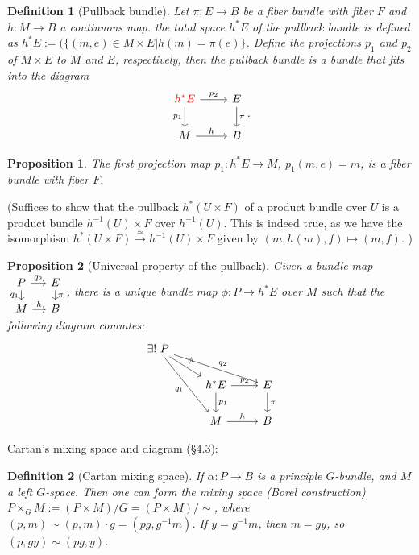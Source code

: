 \documentclass{article}
\theoremstyle{mystyle}
\newtheorem*{definition}{Definition}%
\newtheorem*{proposition*}{Proposition}
\theoremstyle{remark}
\numberwithin{equation}{section}
\begin{document}
\begin{definition}[Pullback bundle] Let $\pi\colon E\rightarrow B$ be a fiber bundle with fiber $F$ and $h\colon M\rightarrow B$ a continuous map. the total space $h^*E$ of the \emph{pullback bundle} is defined as $h^*E:=(\{(m,e)\in M\times E|h(m) = \pi(e)\}$. Define the projections $p_1$ and $p_2$ of $M\times E$ to $M$ and $E$, respectively, then the pullback bundle is a bundle that fits into the diagram
$$
\begin{tikzcd}\color{red}{h^*E}\ar[r,"p_2"]\ar[d,"p_1"'] & E\ar[d,"\pi"]\\M \ar[r,"h"] & B\end{tikzcd}.
$$
\end{definition}

\begin{proposition*} The first projection map $p_1\colon h^*E\rightarrow M$, $p_1(m,e) = m$, is a fiber bundle with fiber $F$.
\end{proposition*}
(Suffices to show that the pullback $h^*(U\times F)$ of a product bundle over $U$ is a product bundle $h^{-1}(U)\times F$ over $h^{-1}(U)$. This is indeed true, as we have the isomorphism $h^*(U\times F) \xrightarrow{\simeq} h^{-1}(U)\times F$ given by $(m,h(m),f)\mapsto (m,f)$. )

\begin{proposition*}[Universal property of the pullback] Given a bundle map 
$\begin{tikzcd}[column sep = small, row sep = small] P\ar[r,"q_2"]\ar[d,"q_1"'] & E\ar[d,"\pi"]\\M \ar[r,"h"] & B\end{tikzcd}$, there is a unique bundle map $\phi\colon P\rightarrow h^*E$ over $M$ such that the following diagram commtes:
$$\begin{tikzcd}
\exists!~P\ar[rrd,"q_2"]\ar[rd,"\phi"]\ar[rdd,"q_1"']
&&\\
&h^*E \ar[r,"p_2"] \ar[d,"p_1"] & E\ar[d,"\pi"]\\ & M \ar[r,"h"] & B\end{tikzcd}
$$
\end{proposition*}



Cartan's mixing space and diagram (\S 4.3):


\begin{definition}[Cartan mixing space] If $\alpha \colon P\rightarrow B$ is a principle $G$-bundle, and $M$ a left $G$-space. Then one can form the \emph{mixing space} (Borel construction)
$P\times_G M:=(P\times M)/G=(P\times M)/\sim$, where $(p,m) \sim (p,m)\cdot g = (pg,g^{-1}m)$. If $y = g^{-1}m$, then $m = gy$, so $(p,gy) \sim (pg,y)$. 
\end{definition}
\end{document}
